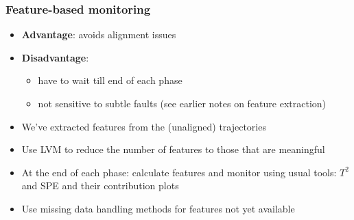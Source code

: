 \begin{frame}[label=featuremonitoring]\frametitle{Feature-based monitoring}
	
	\begin{itemize}
		\item	\textbf{Advantage}: avoids alignment issues
		
		\item	\textbf{Disadvantage}: 
		
				\begin{itemize}
					\item	have to wait till end of each phase
					
					\item	not sensitive to subtle faults (see earlier notes on feature extraction)
				\end{itemize}\pause
	\end{itemize}
	
	{\color{myOrange}{Approach}}
	\begin{itemize}
		\item	We've extracted features from the (unaligned) trajectories
		
		\item	Use LVM to reduce the number of features to those that are meaningful \pause
		
		\item	At the end of each phase: calculate features and monitor using usual tools: \( T^2 \) and SPE and their contribution plots
		
		\item	Use missing data handling methods for features not yet available
		
	\end{itemize}
\end{frame}

